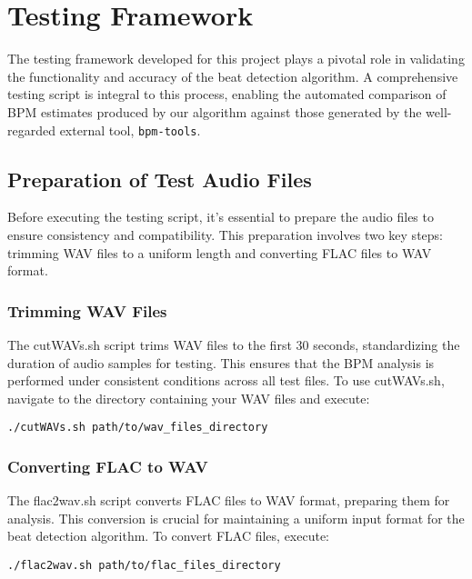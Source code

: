 \section{Testing Framework}

The testing framework developed for this project plays a pivotal role in validating the functionality and accuracy of the beat detection algorithm. A comprehensive testing script is integral to this process, enabling the automated comparison of BPM estimates produced by our algorithm against those generated by the well-regarded external tool, \texttt{bpm-tools}.

\subsection{Preparation of Test Audio Files}

Before executing the testing script, it's essential to prepare the audio files to ensure consistency and compatibility. This preparation involves two key steps: trimming WAV files to a uniform length and converting FLAC files to WAV format.

\subsubsection{Trimming WAV Files}

The cutWAVs.sh script trims WAV files to the first 30 seconds, standardizing the duration of audio samples for testing. This ensures that the BPM analysis is performed under consistent conditions across all test files. To use cutWAVs.sh, navigate to the directory containing your WAV files and execute:

\lstset{style=ShellStyle}
\begin{lstlisting}[caption={Trimming WAV Files}, label=lst]
./cutWAVs.sh path/to/wav_files_directory
\end{lstlisting}

\subsubsection{Converting FLAC to WAV}

The flac2wav.sh script converts FLAC files to WAV format, preparing them for analysis. This conversion is crucial for maintaining a uniform input format for the beat detection algorithm. To convert FLAC files, execute:

\lstset{style=ShellStyle}
\begin{lstlisting}[caption={Converting FLAC to WAV}, label=lst]
./flac2wav.sh path/to/flac_files_directory
\end{lstlisting}

